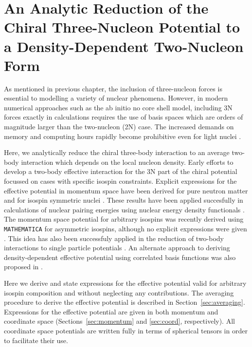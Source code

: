 
\chapter{\label{chap:3to2}An Analytic Reduction of the Chiral Three-Nucleon Potential to a Density-Dependent Two-Nucleon Form}


As mentioned in previous chapter, the inclusion of three-nucleon forces is essential to modelling a variety of nuclear phenomena. However, in modern numerical approaches such as the ab initio no core shell model, including 3N forces exactly in calculations requires the use of basis spaces which are orders of magnitude larger than the two-nucleon (2N) case. The increased demands on memory and computing hours rapidly become prohibitive even for light nuclei \cite{Barrett2013131}. 

Here, we analytically reduce the chiral three-body interaction to an average two-body interaction which depends on the local nucleon density. Early efforts to develop a two-body effective interaction for the 3N part of the chiral potential focussed  on cases with specific isospin constraints. Explicit expressions for  the effective potential in momentum space have been derived for pure neutron matter \cite{PhysRevC.82.014314} and for isospin symmetric nuclei \cite{PhysRevC.81.024002}. These results have been applied succesfully in calculations of nuclear pairing energies using nuclear energy density functionals \cite{0954-3899-39-1-015108}. The momentum space potential for arbitrary isospins was recently derived using \texttt{MATHEMATICA} for asymmetric isospins, although no explicit expressions were given \cite{Drischler:2015eba}. This idea has also been successfuly applied in the reduction of two-body interactions to single particle potentials \cite{PhysRev.133.B329,AdelbergerHaxton}.  An alternate approach to deriving density-dependent effective potential using correlated basis functions was also proposed in \cite{PhysRevC.83.054003}. 

Here we derive and state expressions for the effective potential valid for arbitrary isospin composition and without neglecting any contributions. The averaging procedure to derive the effective potential is described in Section~\ref{sec:averaging}. Expressions for the effective potential are given in both momentum and coordinate space (Sections~\ref{sec:momentum} and \ref{sec:coord}, respectively). All coordinate space potentials are written fully in terms of spherical tensors in order to facilitate their use. 

